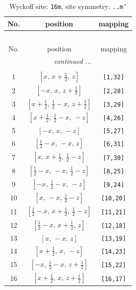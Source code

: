 \documentclass[fleqn,8pt]{jsarticle}
\begin{document}
\renewcommand{\arraystretch}{1.2}
\begin{longtable}{ccc}
\caption{Wyckoff site: {\tt 16m}, site symmetry: {\tt ..m'}}
 \\
 \hline \hline
No. & position & mapping \\ \hline \endfirsthead

\multicolumn{2}{l}{\tablename\ \thetable{}} \\
 \hline \hline
No. & position & mapping \\ \hline \endhead

 \hline \hline
\multicolumn{2}{r}{\footnotesize\it continued ...} \\ \endfoot

 \hline \hline
\multicolumn{2}{r}{} \\ \endlastfoot

1 & $\left[ x,\, x + \frac{1}{2},\, z \right]$ & {\tt [1,32]} \\ \hline
2 & $\left[ - x,\, x,\, z + \frac{1}{2} \right]$ & {\tt [2,28]} \\ \hline
3 & $\left[ x + \frac{1}{2},\, \frac{1}{2} - x,\, z + \frac{1}{2} \right]$ & {\tt [3,29]} \\ \hline
4 & $\left[ x + \frac{1}{2},\, \frac{1}{2} - x,\, - z \right]$ & {\tt [4,26]} \\ \hline
5 & $\left[ - x,\, x,\, - z \right]$ & {\tt [5,27]} \\ \hline
6 & $\left[ \frac{1}{2} - x,\, - x,\, z \right]$ & {\tt [6,31]} \\ \hline
7 & $\left[ x,\, x + \frac{1}{2},\, \frac{1}{2} - z \right]$ & {\tt [7,30]} \\ \hline
8 & $\left[ \frac{1}{2} - x,\, - x,\, \frac{1}{2} - z \right]$ & {\tt [8,25]} \\ \hline
9 & $\left[ - x,\, \frac{1}{2} - x,\, - z \right]$ & {\tt [9,24]} \\ \hline
10 & $\left[ x,\, - x,\, \frac{1}{2} - z \right]$ & {\tt [10,20]} \\ \hline
11 & $\left[ \frac{1}{2} - x,\, x + \frac{1}{2},\, \frac{1}{2} - z \right]$ & {\tt [11,21]} \\ \hline
12 & $\left[ \frac{1}{2} - x,\, x + \frac{1}{2},\, z \right]$ & {\tt [12,18]} \\ \hline
13 & $\left[ x,\, - x,\, z \right]$ & {\tt [13,19]} \\ \hline
14 & $\left[ x + \frac{1}{2},\, x,\, - z \right]$ & {\tt [14,23]} \\ \hline
15 & $\left[ - x,\, \frac{1}{2} - x,\, z + \frac{1}{2} \right]$ & {\tt [15,22]} \\ \hline
16 & $\left[ x + \frac{1}{2},\, x,\, z + \frac{1}{2} \right]$ & {\tt [16,17]} \\
\end{longtable}
\end{document}
